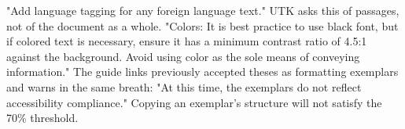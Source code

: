 	{"Add language tagging for any foreign language text." UTK asks this of
	 passages, not of the document as a whole.}
	{"Colors: It is best practice to use black font, but if colored text is
	 necessary, ensure it has a minimum contrast ratio of 4.5:1 against the
	 background. Avoid using color as the sole means of conveying information."}
	{The guide links previously accepted theses as formatting exemplars and warns
	 in the same breath: "At this time, the exemplars do not reflect
	 accessibility compliance." Copying an exemplar's structure will not satisfy
	 the 70\% threshold.}

%
%
%
%
